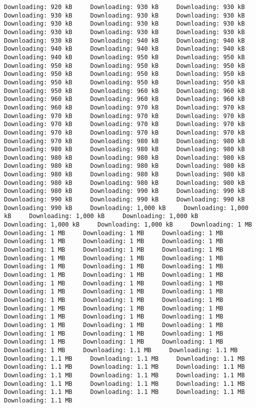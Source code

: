 \documentclass[
  12pt,
]{report}
\begin{document}
\begin{verbatim}
Downloading: 920 kB     Downloading: 930 kB     Downloading: 930 kB     Downloading: 930 kB     Downloading: 930 kB     Downloading: 930 kB     Downloading: 930 kB     Downloading: 930 kB     Downloading: 930 kB     Downloading: 930 kB     Downloading: 930 kB     Downloading: 930 kB     Downloading: 930 kB     Downloading: 940 kB     Downloading: 940 kB     Downloading: 940 kB     Downloading: 940 kB     Downloading: 940 kB     Downloading: 940 kB     Downloading: 950 kB     Downloading: 950 kB     Downloading: 950 kB     Downloading: 950 kB     Downloading: 950 kB     Downloading: 950 kB     Downloading: 950 kB     Downloading: 950 kB     Downloading: 950 kB     Downloading: 950 kB     Downloading: 950 kB     Downloading: 950 kB     Downloading: 960 kB     Downloading: 960 kB     Downloading: 960 kB     Downloading: 960 kB     Downloading: 960 kB     Downloading: 960 kB     Downloading: 970 kB     Downloading: 970 kB     Downloading: 970 kB     Downloading: 970 kB     Downloading: 970 kB     Downloading: 970 kB     Downloading: 970 kB     Downloading: 970 kB     Downloading: 970 kB     Downloading: 970 kB     Downloading: 970 kB     Downloading: 970 kB     Downloading: 980 kB     Downloading: 980 kB     Downloading: 980 kB     Downloading: 980 kB     Downloading: 980 kB     Downloading: 980 kB     Downloading: 980 kB     Downloading: 980 kB     Downloading: 980 kB     Downloading: 980 kB     Downloading: 980 kB     Downloading: 980 kB     Downloading: 980 kB     Downloading: 980 kB     Downloading: 980 kB     Downloading: 980 kB     Downloading: 980 kB     Downloading: 980 kB     Downloading: 990 kB     Downloading: 990 kB     Downloading: 990 kB     Downloading: 990 kB     Downloading: 990 kB     Downloading: 990 kB     Downloading: 1,000 kB     Downloading: 1,000 kB     Downloading: 1,000 kB     Downloading: 1,000 kB     Downloading: 1,000 kB     Downloading: 1,000 kB     Downloading: 1 MB     Downloading: 1 MB     Downloading: 1 MB     Downloading: 1 MB     Downloading: 1 MB     Downloading: 1 MB     Downloading: 1 MB     Downloading: 1 MB     Downloading: 1 MB     Downloading: 1 MB     Downloading: 1 MB     Downloading: 1 MB     Downloading: 1 MB     Downloading: 1 MB     Downloading: 1 MB     Downloading: 1 MB     Downloading: 1 MB     Downloading: 1 MB     Downloading: 1 MB     Downloading: 1 MB     Downloading: 1 MB     Downloading: 1 MB     Downloading: 1 MB     Downloading: 1 MB     Downloading: 1 MB     Downloading: 1 MB     Downloading: 1 MB     Downloading: 1 MB     Downloading: 1 MB     Downloading: 1 MB     Downloading: 1 MB     Downloading: 1 MB     Downloading: 1 MB     Downloading: 1 MB     Downloading: 1 MB     Downloading: 1 MB     Downloading: 1 MB     Downloading: 1 MB     Downloading: 1 MB     Downloading: 1 MB     Downloading: 1 MB     Downloading: 1 MB     Downloading: 1 MB     Downloading: 1 MB     Downloading: 1.1 MB     Downloading: 1.1 MB     Downloading: 1.1 MB     Downloading: 1.1 MB     Downloading: 1.1 MB     Downloading: 1.1 MB     Downloading: 1.1 MB     Downloading: 1.1 MB     Downloading: 1.1 MB     Downloading: 1.1 MB     Downloading: 1.1 MB     Downloading: 1.1 MB     Downloading: 1.1 MB     Downloading: 1.1 MB     Downloading: 1.1 MB     Downloading: 1.1 MB     Downloading: 1.1 MB     Downloading: 1.1 MB     
\end{verbatim}
\end{document}

